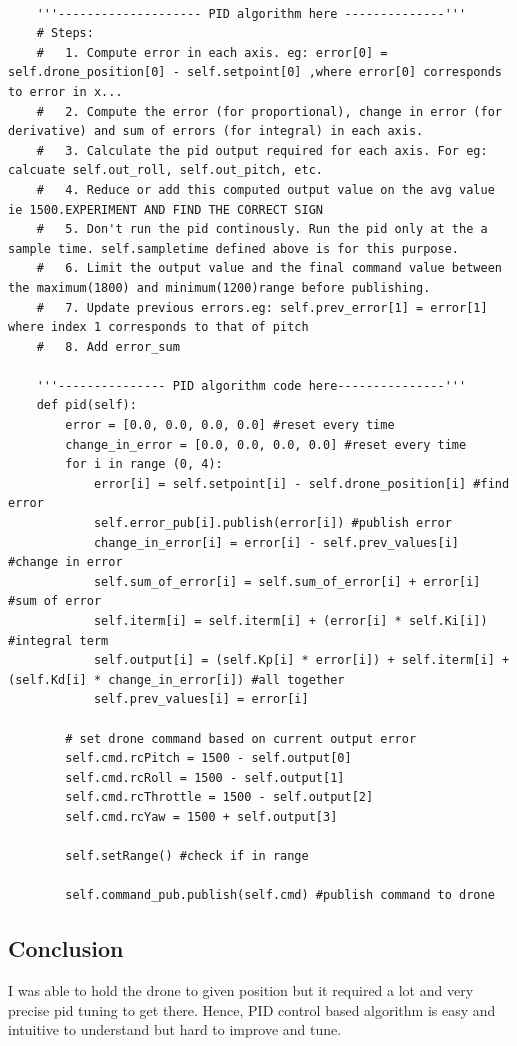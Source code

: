  
% 
\begin{verbatim}

	'''-------------------- PID algorithm here --------------'''
	# Steps:
	# 	1. Compute error in each axis. eg: error[0] = self.drone_position[0] - self.setpoint[0] ,where error[0] corresponds to error in x...
	#	2. Compute the error (for proportional), change in error (for derivative) and sum of errors (for integral) in each axis.
	#	3. Calculate the pid output required for each axis. For eg: calcuate self.out_roll, self.out_pitch, etc.
	#	4. Reduce or add this computed output value on the avg value ie 1500.EXPERIMENT AND FIND THE CORRECT SIGN
	#	5. Don't run the pid continously. Run the pid only at the a sample time. self.sampletime defined above is for this purpose.
	#	6. Limit the output value and the final command value between the maximum(1800) and minimum(1200)range before publishing.
	#	7. Update previous errors.eg: self.prev_error[1] = error[1] where index 1 corresponds to that of pitch
	#	8. Add error_sum
	
	'''--------------- PID algorithm code here---------------'''
	def pid(self):
		error = [0.0, 0.0, 0.0, 0.0] #reset every time
		change_in_error = [0.0, 0.0, 0.0, 0.0] #reset every time
		for i in range (0, 4):
			error[i] = self.setpoint[i] - self.drone_position[i] #find error
			self.error_pub[i].publish(error[i]) #publish error
			change_in_error[i] = error[i] - self.prev_values[i] #change in error
			self.sum_of_error[i] = self.sum_of_error[i] + error[i] #sum of error
			self.iterm[i] = self.iterm[i] + (error[i] * self.Ki[i]) #integral term
			self.output[i] = (self.Kp[i] * error[i]) + self.iterm[i] + (self.Kd[i] * change_in_error[i]) #all together
			self.prev_values[i] = error[i] 
		
		# set drone command based on current output error
		self.cmd.rcPitch = 1500 - self.output[0]
		self.cmd.rcRoll = 1500 - self.output[1]
		self.cmd.rcThrottle = 1500 - self.output[2]
		self.cmd.rcYaw = 1500 + self.output[3]
		
		self.setRange() #check if in range
		
		self.command_pub.publish(self.cmd) #publish command to drone

\end{verbatim}

\subsection{Conclusion}

I was able to hold the drone to given position but it required a lot and very precise pid tuning to get there.
Hence, PID control based algorithm is easy and intuitive to understand but hard to improve and tune.



















